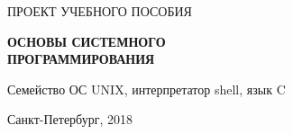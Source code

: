 \begin{titlepage}
	\Large ПРОЕКТ УЧЕБНОГО ПОСОБИЯ
	
	\vspace {4cm}
	
	\Huge\textbf{{\fontsize{30}{30}\selectfont 
	ОСНОВЫ СИСТЕМНОГО
	\\
	ПРОГРАММИРОВАНИЯ}}
	
	\vspace{0.5cm}
	{\large Семейство ОС UNIX, интерпретатор shell, язык C \par}
	


	\vfill
	{\large Санкт-Петербург, 2018}
	
\end{titlepage}

